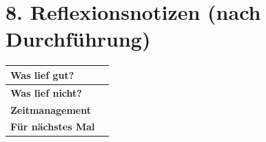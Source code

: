 \documentclass[11pt, a4paper]{article}
\begin{document}

\section*{8. Reflexionsnotizen (nach Durchführung)}

\begin{tabularx}{\textwidth}{|l|X|}
\hline
\textbf{Was lief gut?} & \\[2em]
\hline
\textbf{Was lief nicht?} & \\[2em]
\hline
\textbf{Zeitmanagement} & \\[2em]
\hline
\textbf{Für nächstes Mal} & \\[2em]
\hline
\end{tabularx}
\end{document}
